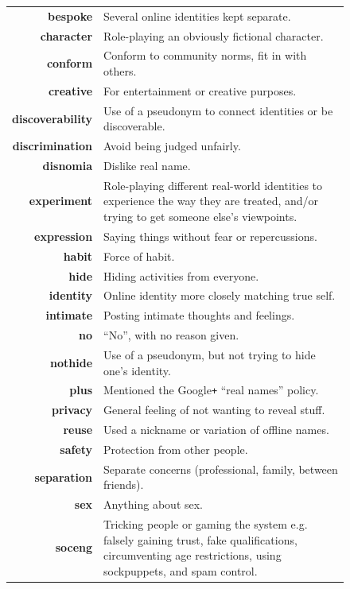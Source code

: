 \documentclass{sig-alternate}
\begin{document}
\begin{figure}[tbp]
    \small
    \begin{tabular}{ r | p{5.5cm} }
		{\bf bespoke} & Several online identities kept separate. \\
		{\bf character} & Role-playing an obviously fictional character. \\
		{\bf conform} & Conform to community norms, fit in with others. \\
		{\bf creative} & For entertainment or creative purposes. \\
		{\bf discoverability} & Use of a pseudonym to connect identities or be discoverable. \\
		{\bf discrimination} & Avoid being judged unfairly. \\
		{\bf disnomia} & Dislike real name. \\
		{\bf experiment} & Role-playing different real-world identities to experience the way they are treated, and/or trying to get someone else's viewpoints. \\
		{\bf expression} & Saying things without fear or repercussions. \\
		{\bf habit} & Force of habit. \\
		{\bf hide} & Hiding activities from everyone. \\
		{\bf identity} & Online identity more closely matching true self. \\
		{\bf intimate} & Posting intimate thoughts and feelings. \\
		{\bf no} & ``No'', with no reason given. \\
		{\bf nothide} & Use of a pseudonym, but not trying to hide one's identity. \\
		{\bf plus} & Mentioned the Google\texttt{+} ``real names'' policy. \\
		{\bf privacy} & General feeling of not wanting to reveal stuff. \\
		{\bf reuse} & Used a nickname or variation of offline names. \\
		{\bf safety} & Protection from other people. \\
		{\bf separation} & Separate concerns (professional, family, between friends).\\
		{\bf sex} & Anything about sex. \\
		{\bf soceng} & Tricking people or gaming the system e.g. falsely gaining trust, fake qualifications, circumventing age restrictions, using sockpuppets, and spam control. \\

\end{tabular}
\end{figure}
\end{document}
